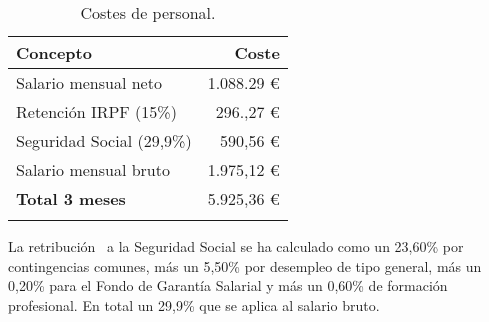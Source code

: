 \begin{longtable}[]{@{}lr@{}}
\toprule
\begin{minipage}[b]{0.38\columnwidth}\raggedright\strut
\textbf{Concepto}\strut
\end{minipage} & \begin{minipage}[b]{0.20\columnwidth}\raggedright\strut
\textbf{Coste}\strut
\end{minipage}\tabularnewline
\midrule
\endhead
\begin{minipage}[t]{0.38\columnwidth}\raggedright\strut
Salario mensual neto\strut
\end{minipage} & \begin{minipage}[t]{0.20\columnwidth}\raggedright\strut
1.088.29 \euro{}\strut
\end{minipage}\tabularnewline
\begin{minipage}[t]{0.38\columnwidth}\raggedright\strut
Retención IRPF (15\%)\strut
\end{minipage} & \begin{minipage}[t]{0.20\columnwidth}\raggedright\strut
296.,27 \euro{}\strut
\end{minipage}\tabularnewline
\begin{minipage}[t]{0.38\columnwidth}\raggedright\strut
Seguridad Social (29,9\%)\strut
\end{minipage} & \begin{minipage}[t]{0.20\columnwidth}\raggedright\strut
590,56 \euro{}\strut
\end{minipage}\tabularnewline
\begin{minipage}[t]{0.38\columnwidth}\raggedright\strut
Salario mensual bruto\strut
\end{minipage} & \begin{minipage}[t]{0.20\columnwidth}\raggedright\strut
1.975,12 \euro{}\strut
\end{minipage}\tabularnewline
\midrule
\begin{minipage}[t]{0.38\columnwidth}\raggedright\strut
\textbf{Total 3 meses}\strut
\end{minipage} & \begin{minipage}[t]{0.20\columnwidth}\raggedright\strut
5.925,36 \euro{}\strut
\end{minipage}\tabularnewline
\bottomrule
\caption{Costes de personal.}
\end{longtable}

La retribución~\cite{SEG} a la Seguridad Social se ha calculado como un 23,60\% por contingencias comunes, más un 5,50\% por desempleo de tipo general, más un 0,20\% para el Fondo de Garantía Salarial y más un 0,60\% de formación profesional. En total un 29,9\% que se aplica al salario bruto.

